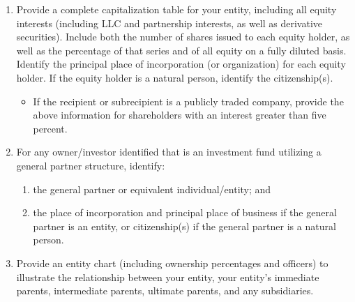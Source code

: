 \documentclass[
]{article}
\providecommand{\tightlist}{%
  \setlength{\itemsep}{0pt}\setlength{\parskip}{0pt}}
\begin{document}
\begin{enumerate}
\def\labelenumi{\arabic{enumi}.}
\tightlist
\item
  Provide a complete capitalization table for your entity, including all
  equity interests (including LLC and partnership interests, as well as
  derivative securities). Include both the number of shares issued to
  each equity holder, as well as the percentage of that series and of
  all equity on a fully diluted basis. Identify the principal place of
  incorporation (or organization) for each equity holder. If the equity
  holder is a natural person, identify the citizenship(s).

  \begin{itemize}
  \tightlist
  \item
    If the recipient or subrecipient is a publicly traded company,
    provide the above information for shareholders with an interest
    greater than five percent.
  \end{itemize}
\item
  For any owner/investor identified that is an investment fund utilizing
  a general partner structure, identify:

  \begin{enumerate}
  \def\labelenumii{\arabic{enumii}.}
  \tightlist
  \item
    the general partner or equivalent individual/entity; and
  \item
    the place of incorporation and principal place of business if the
    general partner is an entity, or citizenship(s) if the general
    partner is a natural person.
  \end{enumerate}
\item
  Provide an entity chart (including ownership percentages and officers)
  to illustrate the relationship between your entity, your entity's
  immediate parents, intermediate parents, ultimate parents, and any
  subsidiaries.


\end{enumerate}
\end{document}
